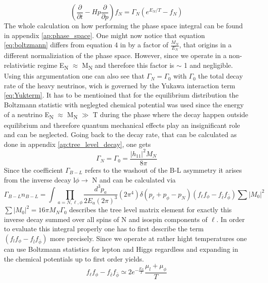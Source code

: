 \begin{equation}
	\left(\frac{\partial}{\partial t}-Hp\frac{\partial}{\partial p}\right)f_N=\Gamma_N\left(e^{E_N/T}-f_N\right)
	\label{eq:boltzmann}
\end{equation}
The whole calculation on how performing the phase space integral can be found in appendix \ref{ap:phase_space}. \newline
One might now notice that equation \ref{eq:boltzmann} differs from equation 4 in \cite{Bodeker:2013qaa} by a factor of $\frac{M_N}{E_N}$, that origins in a different normaliziation of the phase space. However, since we operate in a non-relativistic regime E\textsubscript{N} $\approx$ M\textsubscript{N} and therefore this factor is $\sim$ 1 and negligible. Using this argumentation one can also see that $\Gamma_N=\Gamma_0$ with $\Gamma_0$ the total decay rate of the heavy neutrinos, wich is governed by the Yukawa interaction term \ref{eq:Yukterm}. It has to be mentioined that for the equilibrium distribution the Boltzmann statistic with neglegted chemical potential was used since the energy of a neutrino E\textsubscript{N} $\approx$ M\textsubscript{N} $\gg$ T during the phase where the decay happen outside equilibrium and therefore quantum mechanical effects play an insignificant role and can be neglected. Going back to the decay rate, that can be calculated as done in appendix \ref{ap:tree_level_decay}, one gets
\begin{equation}
\Gamma_N=\Gamma_0=\frac{|h_{11}|^2M_N}{8\pi}
\label{eq:Gamma_N}
\end{equation}
Since the coefficient $\Gamma_{B-L}$ refers to the washout of the B-L asymmetry it arises from the inverse decay l$\phi\rightarrow$ N and can be calculated via 
\begin{equation}
\Gamma_{B-L}n_{B-L}=\int\prod_{a=N,\ell,\phi}\frac{d^3p_a}{2E_a(2\pi)^3}(2\pi^4)\delta(p_\ell+p_\phi-p_N)(	f_\ell f_\phi-f_{\bar{\ell}}f_{\bar{\phi}})\sum|M_0|^2
\label{eq:Gamma_B-L}
\end{equation}
$\sum|M_0|^2=16\pi M_N\Gamma_0$ describes the tree level matrix element for exactly this inverse decay summed over all spins of N and isospin components of $\ell$. In order to evaluate this integral properly one has to first describe the term $(	f_lf_\phi-f_{\bar{l}}f_{\bar{\phi}})$ more precisely. Since we operate at rather hight temperatures one can use Boltzmann statistics for lepton and Higgs regardless and expanding in the chemical potentials up to first order yields.
\begin{equation}
	f_\ell f_\phi-f_{\bar{\ell}}f_{\bar{\phi}}\simeq 2e^{-\frac{E_N}{T}}\frac{\mu_l+\mu_\phi}{T}
	\label{eq:distri_diff}
\end{equation}
